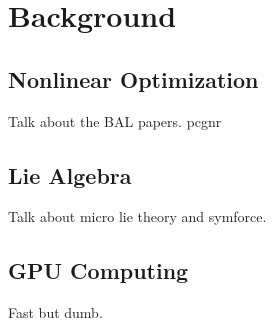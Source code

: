 \section{Background}

\subsection{Nonlinear Optimization}
Talk about the BAL papers.
\gls{pcgnr}



\subsection{Lie Algebra}
Talk about micro lie theory and symforce.

\subsection{GPU Computing}
Fast but dumb.